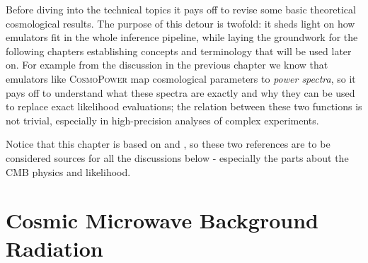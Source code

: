 
Before diving into the technical topics it pays off to revise some basic theoretical cosmological results. The purpose of this detour is twofold: it sheds light on how emulators fit in the whole inference pipeline, while laying the groundwork for the following chapters establishing concepts and terminology that will be used later on. For example from the discussion in the previous chapter we know that emulators like \textsc{CosmoPower} map cosmological parameters to \emph{power spectra}, so it pays off to understand what these spectra are exactly and why they can be used to replace exact likelihood evaluations; the relation between these two functions is not trivial, especially in high-precision analyses of complex experiments.

Notice that this chapter is based on \cite{likelihood_cmb} and \cite{modern_cosmology}, so these two references are to be considered sources for all the discussions below - especially the parts about the CMB physics and likelihood.
\section{Cosmic Microwave Background Radiation}
